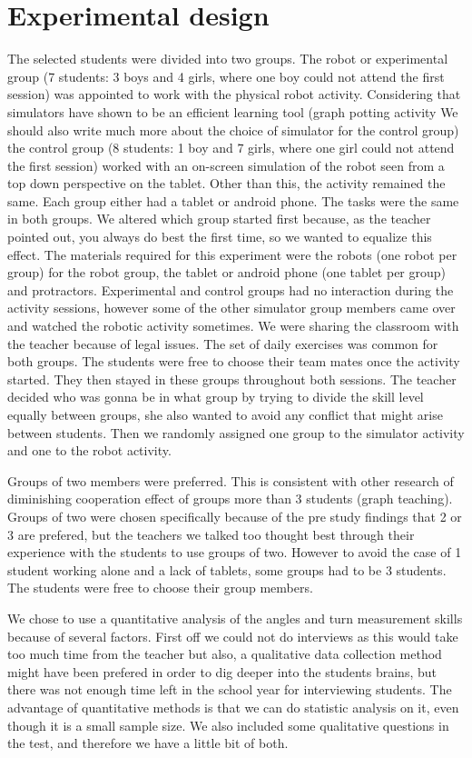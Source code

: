 \chapter{Experimental design}
The selected students were divided into two groups. The robot or experimental group (7 students: 3 boys and 4 girls, where one boy could not attend the first session) was appointed to work with the physical robot activity. Considering that simulators have shown to be an efficient learning tool (graph potting activity We should also write much more about the choice of simulator for the control group) the control group (8 students: 1 boy and 7 girls, where one girl could not attend the first session) worked with an on-screen simulation of the robot seen from a top down perspective on the tablet. Other than this, the activity remained the same. Each group either had a tablet or android phone. The tasks were the same in both groups. We altered which group started first because, as the teacher pointed out, you always do best the first time, so we wanted to equalize this effect. The materials required for this experiment were the robots (one robot per group) for the robot group, the tablet or android phone (one tablet per group) and protractors. Experimental and control groups had no interaction during the activity sessions, however some of the other simulator group members came over and watched the robotic activity sometimes. We were sharing the classroom with the teacher because of legal issues. The set of daily exercises was common for both groups. The students were free to choose their team mates once the activity started. They then stayed in these groups throughout both sessions. The teacher decided who was gonna be in what group by trying to divide the skill level equally between groups, she also wanted to avoid any conflict that might arise between students. Then we randomly assigned one group to the simulator activity and one to the robot activity. 

\bigskip\noindent
Groups of two members were preferred. This is consistent with other research of diminishing cooperation effect of groups more than 3 students (graph teaching). Groups of two were chosen specifically because of the pre study findings that 2 or 3 are prefered, but the teachers we talked too thought best through their experience with the students to use groups of two. However to avoid the case of 1 student working alone and a lack of tablets, some groups had to be 3 students. The students were free to choose their group members.

\bigskip\noindent
We chose to use a quantitative analysis of the angles and turn measurement skills because of several factors. First off we could not do interviews as this would take too much time from the teacher but also, a qualitative data collection method might have been prefered in order to dig deeper into the students brains, but there was not enough time left in the school year for interviewing students. The advantage of quantitative methods is that we can do statistic analysis on it, even though it is a small sample size. We also included some qualitative questions in the test, and therefore we have a little bit of both.
